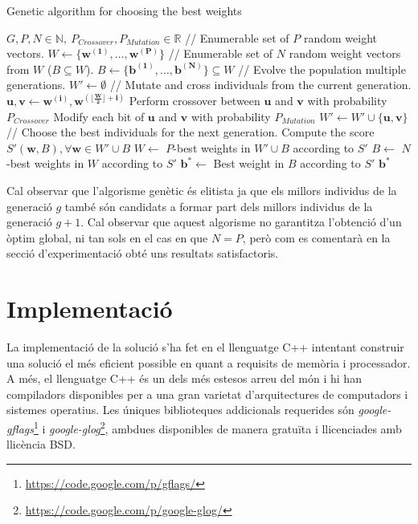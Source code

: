 \documentclass[12pt,a4paper]{article}
\begin{document}
\begin{algorithm}
\caption{Genetic algorithm for choosing the best weights}
\label{alg:genetic_weights}
\begin{algorithmic}[5]
\Require $G, P, N \in \mathbb{N}, ~ P_{Crossover}, P_{Mutation} \in \mathbb{R}$
\State // Enumerable set of $P$ random weight vectors.
\State $W \leftarrow \{\mathbf{w^{(1)}}, \ldots, \mathbf{w^{(P)}} \}$ 
\State // Enumerable set of $N$ random weight vectors from $W$ ($B \subseteq W$).
\State $B \leftarrow \{\mathbf{b^{(1)}}, \ldots, \mathbf{b^{(N)}}\} \subseteq W$
\State // Evolve the population multiple generations.
    \State $W' \leftarrow \emptyset$
    \State // Mutate and cross individuals from the current generation.
	    \State $\mathbf{u}, \mathbf{v} \leftarrow \mathbf{w^{(i)}}, \mathbf{w^{(\lfloor \frac{W}{2} \rfloor + i)}}$
	    \State Perform crossover between $\mathbf{u}$ and $\mathbf{v}$ with probability $P_{Crossover}$
	    \State Modify each bit of $\mathbf{u}$ and $\mathbf{v}$ with probability $P_{Mutation}$
	    		\State $W' \leftarrow W' \cup \{\mathbf{u}, \mathbf{v}\}$
	\EndFor
	\State // Choose the best individuals for the next generation.
	\State Compute the score $S'(\mathbf{w}, B), \forall \mathbf{w} \in W' \cup B$
	\State $W \leftarrow$ $P$-best weights in $W' \cup B$ according to $S'$
	\State $B \leftarrow$ $N$-best weights in $W$ according to $S'$
\EndFor
\State $\mathbf{b}^* \leftarrow$ Best weight in $B$ according to $S'$
\State \Return $\mathbf{b}^*$
\end{algorithmic}
\end{algorithm}

Cal observar que l'algorisme genètic és elitista ja que els millors individus de la generació $g$ també són candidats a formar part dels millors individus de la generació $g+1$. Cal observar que aquest algorisme no garantitza l'obtenció d'un òptim global, ni tan sols en el cas en que $N = P$, però com es comentarà en la secció d'experimentació obté uns resultats satisfactoris.\\

\section{Implementació}
La implementació de la solució s'ha fet en el llenguatge C++ intentant construir una solució el més eficient possible en quant a requisits de memòria i processador. A més, el llenguatge C++ és un dels més estesos arreu del món i hi han compiladors disponibles per a una gran varietat d'arquitectures de computadors i sistemes operatius. Les úniques biblioteques addicionals requerides són \emph{google-gflags}\footnote{\url{https://code.google.com/p/gflags/}} i \emph{google-glog}\footnote{\url{https://code.google.com/p/google-glog/}}, ambdues disponibles de manera gratuïta i llicenciades amb llicència BSD.\\
\end{document}
